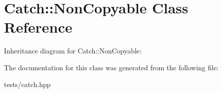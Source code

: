 \hypertarget{class_catch_1_1_non_copyable}{}\section{Catch\+:\+:Non\+Copyable Class Reference}
\label{class_catch_1_1_non_copyable}


Inheritance diagram for Catch\+:\+:Non\+Copyable\+:


The documentation for this class was generated from the following file\+:\begin{DoxyCompactItemize}
\item 
tests/catch.\+hpp\end{DoxyCompactItemize}
